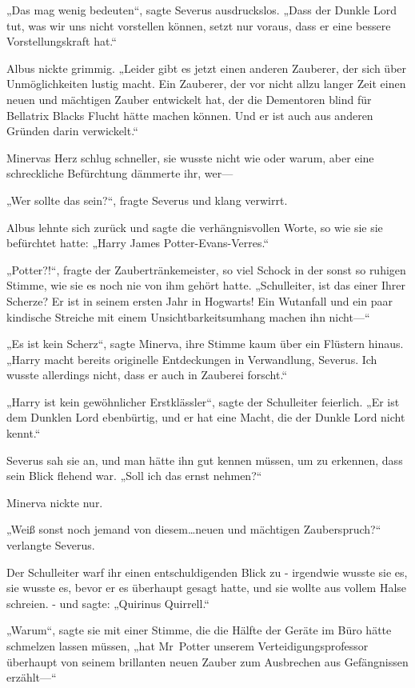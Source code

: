 {„Das mag wenig bedeuten“, sagte Severus ausdruckslos. „Dass der Dunkle Lord tut, was wir uns nicht vorstellen können, setzt nur voraus, dass er eine bessere Vorstellungskraft hat.“

Albus nickte grimmig. „Leider gibt es jetzt einen anderen Zauberer, der sich über Unmöglichkeiten lustig macht. Ein Zauberer, der vor nicht allzu langer Zeit einen neuen und mächtigen Zauber entwickelt hat, der die Dementoren blind für Bellatrix Blacks Flucht hätte machen können. Und er ist auch aus anderen Gründen darin verwickelt.“

Minervas Herz schlug schneller, sie wusste nicht wie oder warum, aber eine schreckliche Befürchtung dämmerte ihr, wer—

„Wer sollte das sein?“, fragte Severus und klang verwirrt.

Albus lehnte sich zurück und sagte die verhängnisvollen Worte, so wie sie sie befürchtet hatte: „Harry James Potter-Evans-Verres.“

„Potter?!“, fragte der Zaubertränkemeister, so viel Schock in der sonst so ruhigen Stimme, wie sie es noch nie von ihm gehört hatte. „Schulleiter, ist das einer Ihrer Scherze? Er ist in seinem ersten Jahr in Hogwarts! Ein Wutanfall und ein paar kindische Streiche mit einem Unsichtbarkeitsumhang machen ihn nicht—“

„Es ist kein Scherz“, sagte Minerva, ihre Stimme kaum über ein Flüstern hinaus. „Harry macht bereits originelle Entdeckungen in Verwandlung, Severus. Ich wusste allerdings nicht, dass er auch in Zauberei forscht.“

„Harry ist kein gewöhnlicher Erstklässler“, sagte der Schulleiter feierlich. „Er ist dem Dunklen Lord ebenbürtig, und er hat eine Macht, die der Dunkle Lord nicht kennt.“

Severus sah sie an, und man hätte ihn gut kennen müssen, um zu erkennen, dass sein Blick flehend war. „Soll ich das ernst nehmen?“

Minerva nickte nur.

„Weiß sonst noch jemand von diesem…neuen und mächtigen Zauberspruch?“ verlangte Severus.

Der Schulleiter warf ihr einen entschuldigenden Blick zu - irgendwie wusste sie es, sie wusste es, bevor er es überhaupt gesagt hatte, und sie wollte aus vollem Halse schreien. - und sagte: „Quirinus Quirrell.“

„Warum“, sagte sie mit einer Stimme, die die Hälfte der Geräte im Büro hätte schmelzen lassen müssen, „hat Mr~Potter unserem Verteidigungsprofessor überhaupt von seinem brillanten neuen Zauber zum Ausbrechen aus Gefängnissen erzählt—“

}
